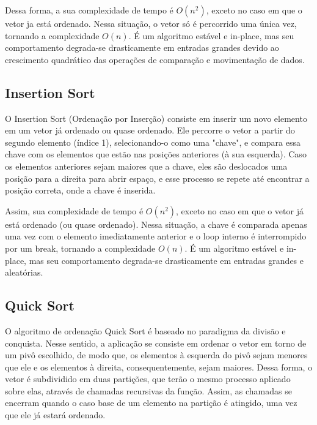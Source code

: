 \documentclass{article}
\begin{document}
        Dessa forma, a sua complexidade de tempo é $O(n^2)$, exceto no caso em que o vetor ja está ordenado. 
        Nessa situação, o vetor só é percorrido uma única vez, tornando a complexidade $O(n)$.
        É um algoritmo estável e in-place, mas seu comportamento degrada-se drasticamente em entradas grandes devido ao crescimento quadrático das operações de comparação e movimentação de dados.

    \subsection{Insertion Sort}
        O Insertion Sort (Ordenação por Inserção) consiste em inserir um novo elemento em um vetor já ordenado ou quase ordenado.
        Ele percorre o vetor a partir do segundo elemento (índice 1), selecionando-o como uma "chave", e compara essa chave com os elementos que estão nas posições anteriores (à sua esquerda).
        Caso os elementos anteriores sejam maiores que a chave, eles são deslocados uma posição para a direita para abrir espaço, e esse processo se repete até encontrar a posição correta, onde a chave é inserida.
        
        Assim, sua complexidade de tempo é $O(n^2)$, exceto no caso em que o vetor já está ordenado (ou quase ordenado).
        Nessa situação, a chave é comparada apenas uma vez com o elemento imediatamente anterior e o loop interno é interrompido por um break, tornando a complexidade $O(n)$.
        É um algoritmo estável e in-place, mas seu comportamento degrada-se drasticamente em entradas grandes e aleatórias.

    \subsection{Quick Sort}
        O algoritmo de ordenação Quick Sort é baseado no paradigma da divisão e conquista. 
        Nesse sentido, a aplicação se consiste em ordenar o vetor em torno de um pivô escolhido, de modo que, os elementos à esquerda do pivô sejam menores que ele e os elementos à direita, consequentemente, sejam maiores.
        Dessa forma, o vetor é subdividido em duas partições, que terão o mesmo processo aplicado sobre elas, através de chamadas recursivas da função. 
        Assim, as chamadas se encerram quando o caso base de um elemento na partição é atingido, uma vez que ele já estará ordenado. 
        
\end{document}
